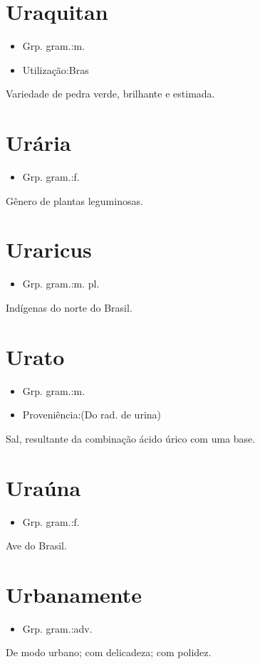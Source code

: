 \documentclass{article}
\begin{document}
\section{Uraquitan}
\begin{itemize}
\item {Grp. gram.:m.}
\end{itemize}
\begin{itemize}
\item {Utilização:Bras}
\end{itemize}
Variedade de pedra verde, brilhante e estimada.
\section{Urária}
\begin{itemize}
\item {Grp. gram.:f.}
\end{itemize}
Gênero de plantas leguminosas.
\section{Uraricus}
\begin{itemize}
\item {Grp. gram.:m. pl.}
\end{itemize}
Indígenas do norte do Brasil.
\section{Urato}
\begin{itemize}
\item {Grp. gram.:m.}
\end{itemize}
\begin{itemize}
\item {Proveniência:(Do rad. de \textunderscore urina\textunderscore )}
\end{itemize}
Sal, resultante da combinação ácido úrico com uma base.
\section{Uraúna}
\begin{itemize}
\item {Grp. gram.:f.}
\end{itemize}
Ave do Brasil.
\section{Urbanamente}
\begin{itemize}
\item {Grp. gram.:adv.}
\end{itemize}
De modo urbano; com delicadeza; com polidez.
\end{document}
